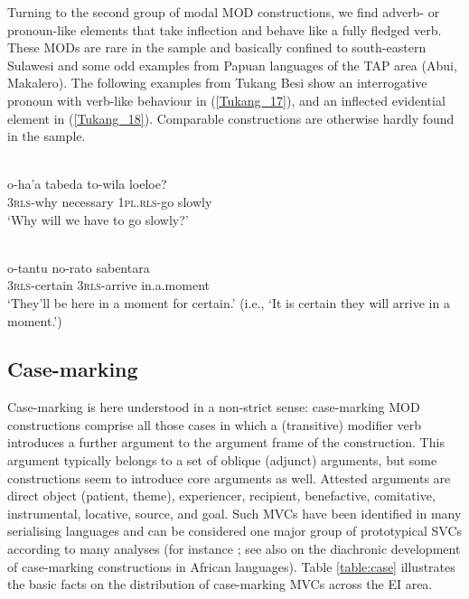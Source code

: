 Turning to the second group of modal MOD constructions, we find adverb- or pronoun-like elements that take inflection and behave like a fully fledged verb. These MODs are rare in the sample and basically confined to south-eastern Sulawesi and some odd examples from Papuan languages of the TAP area (Abui, Makalero). The following examples from Tukang Besi show an interrogative pronoun with verb-like behaviour in (\ref{Tukang_17}), and an inflected evidential element in (\ref{Tukang_18}). Comparable constructions are otherwise hardly found in the sample.

\ea \label{Tukang_17}
\\
\gll o-ha'a tabeda to-wila loeloe? \\
3\textsc{rls}-why necessary 1\textsc{pl}.\textsc{rls}-go slowly \\
\glft `Why will we have to go slowly?'\\ 
\z

\ea \label{Tukang_18}
\\
\gll o-tantu no-rato sabentara \\
3\textsc{rls}-certain 3\textsc{rls}-arrive in.a.moment \\
\glft `They'll be here in a moment for certain.' (i.e., `It is certain they will arrive in a moment.')\\ 
\z

\subsection{Case-marking} \label{sec:case-marking}

Case-marking is here understood in a non-strict sense: case-marking MOD constructions comprise all those cases in which a (transitive) modifier verb introduces a further argument to the argument frame of the construction. This argument typically belongs to a set of oblique (adjunct) arguments, but some constructions seem to introduce core arguments as well. Attested arguments are direct object (patient, theme), experiencer, recipient, benefactive, comitative, instrumental, locative, source, and goal. Such MVCs have been identified in many serialising languages and can be considered one major group of prototypical SVCs according to many analyses (for instance \citealt{givon1991serial, Aikhenvald2006, haspelmath2016serial}; see also \citealt{lord1993historical} on the diachronic development of case-marking constructions in African languages). Table \ref{table:case} illustrates the basic facts on the distribution of case-marking MVCs across the EI area.

